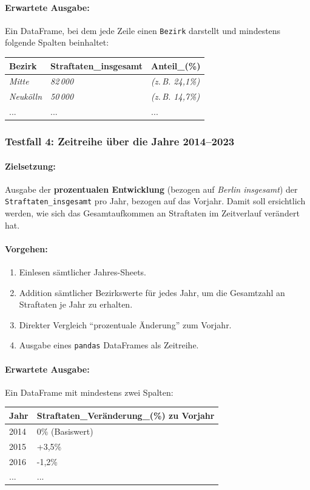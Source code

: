 \documentclass[11pt,a4paper]{article}
\begin{document}
\paragraph{Erwartete Ausgabe:}
Ein DataFrame, bei dem jede Zeile einen \texttt{Bezirk} darstellt und mindestens folgende Spalten beinhaltet:
\begin{center}
\begin{tabular}{l|l|l}
\textbf{Bezirk} & \textbf{Straftaten\_insgesamt} & \textbf{Anteil\_(\%)} \\
\hline
\textit{Mitte} & \textit{82\,000} & \textit{(z.\,B. 24,1\%)} \\
\textit{Neukölln} & \textit{50\,000} & \textit{(z.\,B. 14,7\%)} \\
... & ... & ...
\end{tabular}
\end{center}

\subsubsection{Testfall 4: Zeitreihe über die Jahre 2014--2023}
\paragraph{Zielsetzung:}
Ausgabe der \textbf{prozentualen Entwicklung} (bezogen auf \emph{Berlin insgesamt}) der \texttt{Straftaten\_insgesamt} pro Jahr, bezogen auf das Vorjahr. Damit soll ersichtlich werden, wie sich das Gesamtaufkommen an Straftaten im Zeitverlauf verändert hat. 

\paragraph{Vorgehen:}
\begin{enumerate}
    \item Einlesen sämtlicher Jahres-Sheets.
    \item Addition sämtlicher Bezirkswerte für jedes Jahr, um die Gesamtzahl an Straftaten je Jahr zu erhalten.
    \item Direkter Vergleich \enquote{prozentuale Änderung} zum Vorjahr.
    \item Ausgabe eines \texttt{pandas} DataFrames als Zeitreihe.
\end{enumerate}

\paragraph{Erwartete Ausgabe:}
Ein DataFrame mit mindestens zwei Spalten:
\begin{center}
\begin{tabular}{l|l}
\textbf{Jahr} & \textbf{Straftaten\_Veränderung\_(\%) zu Vorjahr} \\
\hline
2014 & 0\% (Basiswert) \\
2015 & +3,5\% \\
2016 & -1,2\% \\
... & ...
\end{tabular}
\end{center}
\end{document}

